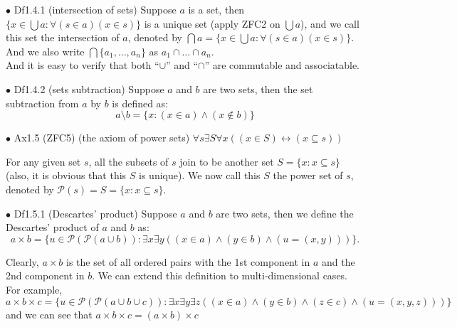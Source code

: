 \documentclass{article}
\begin{document}
\begin{Df}{$\bullet$ Df1.4.1 (intersection of sets)}
    \textcolor{Th}{Suppose $a$ is a set, then $\{x\in \bigcup a: \forall (s\in a) (x\in s)\}$ is a unique set (apply ZFC2 on $\bigcup a$)}, and we call this set the intersection of $a$, denoted by $\bigcap a = \{x\in \bigcup a: \forall (s\in a) (x\in s)\}$. And we also write $\bigcap\{a_1,\dots, a_n\}$ as $a_1\cap \dots \cap a_n$.\\
    And it is easy to verify that \textcolor{Th}{both ``$\cup$'' and ``$\cap$'' are commutable and associatable.}
\end{Df}

\begin{Df}{$\bullet$ Df1.4.2 (sets subtraction)}
    Suppose $a$ and $b$ are two sets, then the set subtraction from $a$ by $b$ is defined as: $$a\setminus b = \{x: (x\in a)\land (x\notin b)\}$$
\end{Df}

\begin{Ax}{$\bullet$ Ax1.5 (ZFC5) (the axiom of power sets)}
    \textcolor{Ax}{$\forall s\exists S\forall x \left((x\in S)\leftrightarrow (x\subseteq s)\right)$}
\end{Ax}
For any given set $s$, all the subsets of $s$ join to be another set $S = \{x: x\subseteq s\}$ (\textcolor{Th}{also, it is obvious that this $S$ is unique}). \textcolor{Df}{We now call this $S$ the power set of $s$, denoted by $\mathcal{P}(s) = S = \{x: x\subseteq s\}$.}

\begin{Df}{$\bullet$ Df1.5.1 (Descartes' product)}
    Suppose $a$ and $b$ are two sets, then we define the Descartes' product of $a$ and $b$ as:
    $$a\times b = \{u\in \mathcal{P}(\mathcal{P}(a\cup b)): \exists x\exists y \left((x\in a)\land (y\in b)\land (u=(x,y))\right)\}.$$
\end{Df}
Clearly, $a\times b$ is the set of all ordered pairs with the 1st component in $a$ and the 2nd component in $b$.
We can extend this definition to multi-dimensional cases. For example, 
$$a\times b\times c = \{u\in \mathcal{P}(\mathcal{P}(a\cup b\cup c)): \exists x\exists y\exists z \left((x\in a)\land (y\in b)\land (z\in c)\land (u=(x,y,z))\right)\}$$
and we can see that \textcolor{Th}{$a\times b\times c = (a\times b)\times c$}
\end{document}
